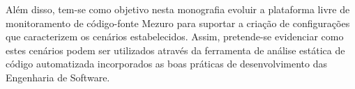 %

Além disso, tem-se como objetivo nesta monografia evoluir a plataforma livre de monitoramento de código-fonte Mezuro para suportar a criação de configurações que caracterizem os cenários estabelecidos. Assim, pretende-se evidenciar como estes cenários podem ser utilizados através da ferramenta de análise estática de código automatizada incorporados as boas práticas de desenvolvimento das Engenharia de Software.
